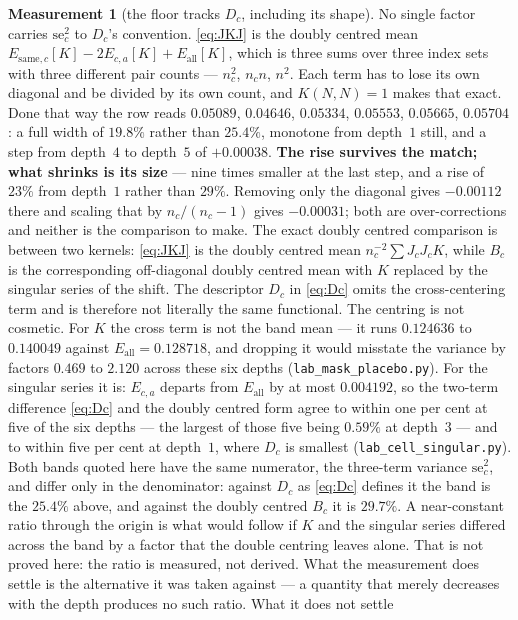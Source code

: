 \documentclass[11pt,a4paper]{article}
\theoremstyle{plain}
\theoremstyle{definition}
\newtheorem{measurement}[theorem]{Measurement}
\theoremstyle{remark}
\begin{document}
\begin{measurement}[the floor tracks $D_c$, including its shape]
No single factor carries $\mathrm{se}_c^2$ to $D_c$'s convention.
\eqref{eq:JKJ} is the
doubly centred mean $E_{\mathrm{same},c}[K]-2E_{c,a}[K]+E_{\mathrm{all}}[K]$,
which is three sums over three index sets with three different pair
counts --- $n_c^2$, $n_cn$, $n^2$. Each term has to lose its own
diagonal and be divided by its own count, and $K(N,N)=1$ makes that
exact. Done that way the row reads $0.05089$, $0.04646$, $0.05334$,
$0.05553$, $0.05665$, $0.05704$: a full width of $19.8\%$ rather than
$25.4\%$, monotone from depth~$1$ still, and a step from depth~$4$ to
depth~$5$ of $+0.00038$. \textbf{The rise survives the match; what
shrinks is its size} --- nine times smaller at the last step, and a
rise of $23\%$ from depth~$1$ rather than $29\%$. Removing only the
diagonal gives $-0.00112$ there and scaling that by $n_c/(n_c-1)$
gives $-0.00031$; both are over-corrections and neither is the
comparison to make. The exact doubly centred comparison is between two kernels:
\eqref{eq:JKJ} is the doubly centred mean
$n_c^{-2}\sum J_cJ_cK$, while $B_c$ is the corresponding off-diagonal
doubly centred mean with $K$ replaced by the singular series of the
shift. The descriptor $D_c$ in \eqref{eq:Dc} omits the cross-centering
term and is therefore not literally the same functional. The centring is not
cosmetic. For $K$ the cross term is not the band mean --- it runs
$0.124636$ to $0.140049$ against $E_{\mathrm{all}}=0.128718$, and
dropping it would misstate the variance by factors $0.469$ to $2.120$
across these six depths (\texttt{lab\_mask\_placebo.py}). For the
singular series it is: $E_{c,a}$ departs from $E_{\mathrm{all}}$ by at
most $0.004192$, so the two-term difference \eqref{eq:Dc} and the
doubly centred form agree to within one per cent at five of the six
depths --- the largest of those five being $0.59\%$ at depth~$3$ ---
and to within five per cent at depth~$1$, where $D_c$ is
smallest (\texttt{lab\_cell\_singular.py}). Both bands quoted here have
the same numerator, the three-term variance $\mathrm{se}_c^2$, and
differ only in the denominator: against $D_c$ as \eqref{eq:Dc} defines
it the band is the $25.4\%$ above, and against the doubly centred
$B_c$ it is $29.7\%$.
A near-constant ratio through the origin is what would follow if $K$
and the singular series differed across the band by a factor that the
double centring leaves alone. That is not proved here: the ratio is
measured, not derived. What the measurement does settle is the
alternative it was taken against --- a quantity that merely decreases
with the depth produces no such ratio. What it does not settle

\end{measurement}
\end{document}
